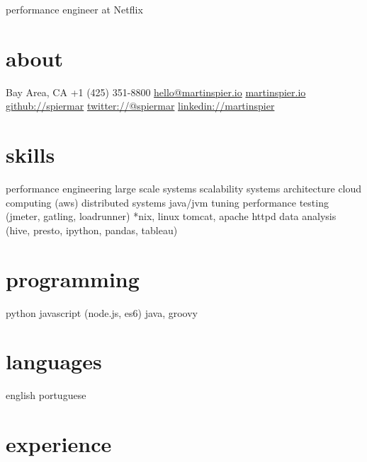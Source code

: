 \documentclass[]{mspier-cv}
\begin{document}
       {performance engineer at Netflix}

\begin{aside}
  \section{about}
    {Bay Area, CA}
    {+1 (425) 351-8800}
    \href{mailto:hello@martinspier.io}{hello@martinspier.io}
    \href{http://martinspier.io}{martinspier.io}
    \href{https://github.com/spiermar}{github://spiermar}
    \href{https://twitter.com/spiermar}{twitter://@spiermar}
    \href{https://www.linkedin.com/in/martinspier}{linkedin://martinspier}
  \section{skills}
    performance engineering
    large scale systems
    scalability
    systems architecture
    cloud computing
    (aws)
    distributed systems
    java/jvm tuning
    performance testing
    (jmeter, gatling, loadrunner)
    *nix, linux
    tomcat, apache httpd
    data analysis
    (hive, presto, ipython, pandas, tableau)
  \section{programming}
    python
    javascript
    (node.js, es6)
    java, groovy
  \section{languages}
    english
    portuguese
\end{aside}

\section{experience}
\end{document}
